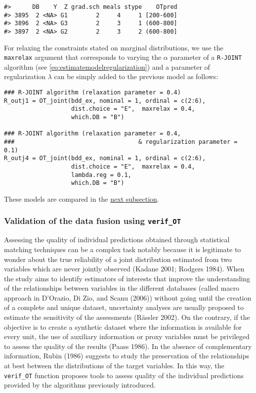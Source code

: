 \begin{verbatim}
#>      DB    Y  Z grad.sch meals stype    OTpred
#> 3895  2 <NA> G1        2     4     1 [200-600]
#> 3896  2 <NA> G3        2     3     1 (600-800]
#> 3897  2 <NA> G2        2     3     2 (600-800]
\end{verbatim}

For relaxing the constraints stated on marginal distributions, we use the \texttt{maxrelax} argument that corresponds to varying the \(\alpha\) parameter of a \texttt{R-JOINT} algorithm (see \eqref{eq:estimatemodelregularization}) and a parameter of regularization \(\lambda\) can be simply added to the previous model as follows:

\begin{verbatim}
### R-JOINT algorithm (relaxation parameter = 0.4)
R_outj1 = OT_joint(bdd_ex, nominal = 1, ordinal = c(2:6), 
                   dist.choice = "E",  maxrelax = 0.4,
                   which.DB = "B")

### R-JOINT algorithm (relaxation parameter = 0.4,
###                                   & regularization parameter = 0.1)
R_outj4 = OT_joint(bdd_ex, nominal = 1, ordinal = c(2:6), 
                   dist.choice = "E",  maxrelax = 0.4,
                   lambda.reg = 0.1,
                   which.DB = "B")
\end{verbatim}

These models are compared in the \protect\hyperlink{vodf}{next subsection}.

\hypertarget{vodf}{%
\subsubsection{\texorpdfstring{Validation of the data fusion using \texttt{verif\_OT}}{Validation of the data fusion using verif\_OT}}\label{vodf}}

Assessing the quality of individual predictions obtained through statistical matching techniques can be a complex task notably because it is legitimate to wonder about the true reliability of a joint distribution estimated from two variables which are never jointly observed (Kadane 2001; Rodgers 1984). When the study aims to identify estimators of interests that improve the understanding of the relationships between variables in the different databases (called macro approach in D'Orazio, Di Zio, and Scanu (2006)) without going until the creation of a complete and unique dataset, uncertainty analyses are usually proposed to estimate the sensitivity of the assessments (Rässler 2002). On the contrary, if the objective is to create a synthetic dataset where the information is available for every unit, the use of auxiliary information or proxy variables must be privileged to assess the quality of the results (Paass 1986). In the absence of complementary information, Rubin (1986) suggests to study the preservation of the relationships at best between the distributions of the target variables. In this way, the \texttt{verif\_OT} function proposes tools to assess quality of the individual predictions provided by the algorithms previously introduced.

